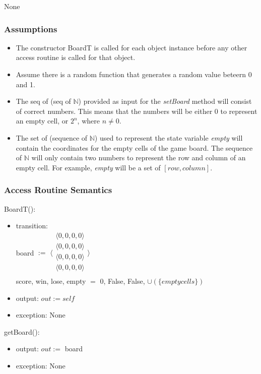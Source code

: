 \documentclass[12pt]{article}
\begin{document}
None

\subsubsection* {Assumptions}

\begin{itemize}
  \item The constructor BoardT is called for each object instance before any other access routine 
  is called for that object. 
  \item Assume there is a random function that generates a random value beteern 0 and 1.
  \item The seq of (seq of $\mathbb{N}$) provided as input for the \textit{setBoard} method will consist of correct numbers. This means that the numbers will be either $0$ to represent an empty cell, or $2^n$, where $n \ne 0$.
  \item The set of (sequence of $\mathbb{N}$) used to represent the state variable \textit{empty} will contain the coordinates for the empty cells of the game board. The sequence of $\mathbb{N}$ will only contain two numbers to represent the row and column of an empty cell. For example, \textit{empty} will be a set of $[row, column]$.
\end{itemize}

\subsubsection* {Access Routine Semantics}

BoardT():
\begin{itemize}
\item transition: \\
      board $:=$ 
      $\langle \begin{array}{c}
      \langle 0, 0, 0, 0 \rangle\\
      \langle 0, 0, 0, 0 \rangle\\
      \langle 0, 0, 0, 0 \rangle\\
      \langle 0, 0, 0, 0 \rangle\\
      \end{array} \rangle$ \\ 
      score, win, lose, empty $=$ 0, False, False, $\cup (\{empty cells\})$
\item output: $out := \mathit{self}$
\item exception: None
\end{itemize}

\noindent getBoard():
\begin{itemize}
\item output: $out :=$ board
\item exception: None
\end{itemize}
\end{document}
